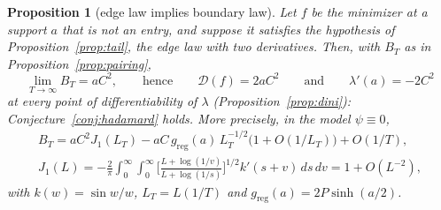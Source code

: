 \documentclass[11pt]{article}
\newtheorem{proposition}[theorem]{Proposition}
\theoremstyle{definition}
\theoremstyle{remark}
\begin{document}
\begin{proposition}[edge law implies boundary law]\label{prop:flux}
Let $f$ be the minimizer at a support $a$ that is not an entry, and suppose it satisfies the hypothesis of Proposition~\ref{prop:tail}, the edge law with two derivatives. Then, with $B_T$ as in Proposition~\ref{prop:pairing},
\[
\lim_{T\to\infty}B_T=aC^2,\qquad\text{hence}\qquad\mathcal D(f)=2aC^2\qquad\text{and}\qquad\lambda'(a)=-2C^2
\]
at every point of differentiability of $\lambda$ (Proposition~\ref{prop:dini}): Conjecture~\ref{conj:hadamard} holds. More precisely, in the model $\psi\equiv0$,
\begin{gather*}
B_T=aC^2J_1(L_T)-aC\,g_{\mathrm{reg}}(a)\,L_T^{-1/2}\big(1+O(1/L_T)\big)+O(1/T),\\
J_1(L)=-\frac2\pi\int_0^\infty\!\!\int_0^\infty\Big[\frac{L+\log(1/v)}{L+\log(1/s)}\Big]^{1/2}k'(s+v)\,ds\,dv=1+O(L^{-2}),
\end{gather*}
with $k(w)=\sin w/w$, $L_T=L(1/T)$ and $g_{\mathrm{reg}}(a)=2P\sinh(a/2)$.
\end{proposition}
\end{document}
